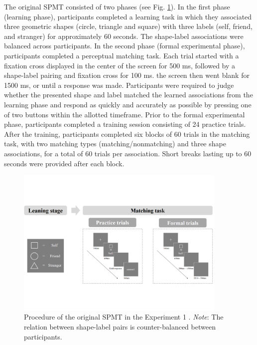\documentclass[sn-apa]{sn-jnl}%
\theoremstyle{thmstyleone}%
\theoremstyle{thmstyletwo}%
\theoremstyle{thmstylethree}%
\begin{document}
The original SPMT consisted of two phases (see Fig. \ref{fig:SPMT_procedure}). In the first phase (learning phase), participants completed a learning task in which they associated three geometric shapes (circle, triangle and square) with three labels (self, friend, and stranger) for approximately 60 seconds. The shape-label associations were balanced across participants. In the second phase (formal experimental phase), participants completed a perceptual matching task. Each trial started with a fixation cross displayed in the center of the screen for 500 ms, followed by a shape-label pairing and fixation cross for 100 ms. the screen then went blank for 1500 ms, or until a response was made. Participants were required to judge whether the presented shape and label matched the learned associations from the learning phase and respond as quickly and accurately as possible by pressing one of two buttons within the allotted timeframe. Prior to the formal experimental phase, participants completed a training session consisting of 24 practice trials. After the training, participants completed six blocks of 60 trials in the matching task, with two matching types (matching/nonmatching) and three shape associations, for a total of 60 trials per association. Short breaks lasting up to 60 seconds were provided after each block. 

\begin{figure}[h]%
	\centering
	\includegraphics[width=0.9\textwidth]{./Figure/Fig_1_exp_pro.pdf}
	\caption{Procedure of the original SPMT in the Experiment 1 \textcite{sui2012perceptual}. \textit{Note}: The relation between shape-label pairs is counter-balanced between participants.
	}\label{fig:SPMT_procedure}
\end{figure}
\end{document}
